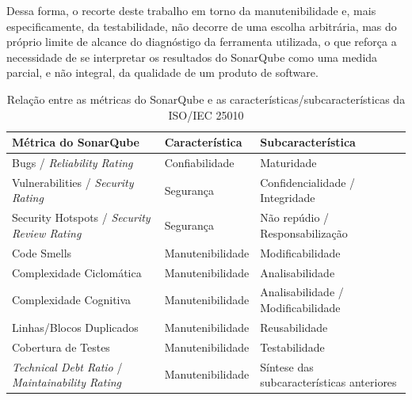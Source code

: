 Dessa forma, o recorte deste trabalho em torno da manutenibilidade e, mais especificamente, da testabilidade, não decorre de uma escolha arbitrária, mas do próprio limite de alcance do diagnóstigo da ferramenta utilizada, o que reforça a necessidade de se interpretar os resultados do SonarQube como uma medida parcial, e não integral, da qualidade de um produto de software.

\begin{table}[htb]
    \centering
    \caption{Relação entre as métricas do SonarQube e as características/subcaracterísticas da ISO/IEC 25010}
    \label{tab:metricas-iso25010}
    \begin{tabular}{p{4cm}p{3.5cm}p{5cm}}
        \hline
        \textbf{Métrica do SonarQube} & \textbf{Característica} & \textbf{Subcaracterística} \\
        \hline
        Bugs / \textit{Reliability Rating} & Confiabilidade & Maturidade \\
        Vulnerabilities / \textit{Security Rating} & Segurança & Confidencialidade / Integridade \\
        Security Hotspots / \textit{Security Review Rating} & Segurança & Não repúdio / Responsabilização \\
        Code Smells & Manutenibilidade & Modificabilidade \\
        Complexidade Ciclomática & Manutenibilidade & Analisabilidade \\
        Complexidade Cognitiva & Manutenibilidade & Analisabilidade / Modificabilidade \\
        Linhas/Blocos Duplicados & Manutenibilidade & Reusabilidade \\
        Cobertura de Testes & Manutenibilidade & Testabilidade \\
        \textit{Technical Debt Ratio} / \textit{Maintainability Rating} & Manutenibilidade & Síntese das subcaracterísticas anteriores \\
        \hline
    \end{tabular}
\end{table}
